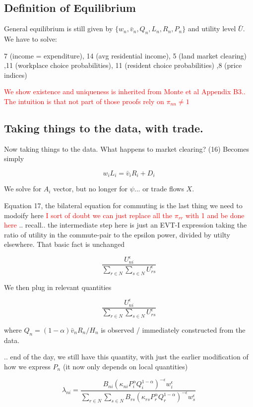 \documentclass{article}
\begin{document}
\subsection{Definition of Equilibrium}
General equilibrium is still given by
$\{w_n, \bar v_n, Q_n, L_n, R_n, P_n \}$ and utility level $\bar U$. We have to solve:

7 (income = expenditure), 14 (avg residential income), 5 (land market clearing) ,11 (workplace choice probabilities), 11 (resident choice probabilities) ,8 (price indices)

\textcolor{red}{We show existence and uniqueness is inherited from Monte et al Appendix B3.. The intuition is that not part of those proofs rely on $\pi_{nn} \neq 1$ }

\subsection{Taking things to the data, with trade.}
Now taking things to the data. What happens to market clearing? 
(16) Becomes simply

$$w_i L_i =  \bar v_i R_i + D_i $$

We solve for $A_i$ vector, but no longer for $\psi$... or trade flows $X$.

Equation 17, the bilateral equation for commuting is the last thing we need to modoify here \textcolor{red}{I sort of doubt we can just replace all the $\pi_{rr}$ with 1 and be done here}
.. recall.. the intermediate step here is just an EVT-I expression taking the ratio of utility in the commute-pair to the epsilon power, divided by utilty elsewhere.
That basic fact is unchanged

$$ \frac{U_{ni}^\epsilon }{\sum_{r \in N} \sum_{s \in N}  U_{rs}^{\epsilon}  }$$

We then plug in relevant quantities

$$ \frac{U_{ni}^\epsilon }{\sum_{r \in N} \sum_{s \in N}  U_{rs}^{\epsilon}  }$$

where $Q_n  = (1-\alpha) \bar v_n R_n / H_n$ is observed / immediately constructed from  the data.

.. end of the day, we still have this quantity, with just the earlier modification of how we express $P_n$ (it now only depends on local quantities)

$$\lambda_{ni} = \frac{B_{ni} \left(\kappa_{ni}P_i^{\alpha}Q_i^{1-\alpha}\right)^{-\epsilon} w_i^{\epsilon}}{\sum_{r \in N} \sum_{s \in N} B_{rs} \left(\kappa_{rs}P_r^{\alpha}Q_r^{1-\alpha}\right)^{-\epsilon} w_s^{\epsilon}}$$
\end{document}
